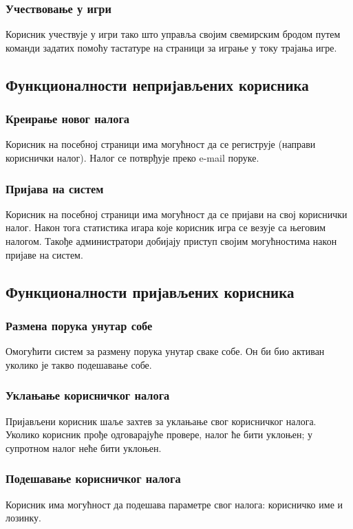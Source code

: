 \subsubsection{Учествовање у игри}
Корисник учествује у игри тако што управља својим свемирским бродом путем команди задатих помоћу тастатуре
на страници за играње у току трајања игре.

\subsection{Функционалности непријављених корисника}

\subsubsection{Креирање новог налога} 
Корисник на посебној страници има могућност да се региструје (направи кориснички налог).
Налог се потврђује преко e-mail поруке.

\subsubsection{Пријава на систем}
Корисник на посебној страници има могућност да се пријави на свој кориснички налог.
Након тога статистика игара које корисник игра се везује са његовим налогом. 
Такође администратори добијају приступ својим могућностима након пријаве на систем.

\subsection{Функционалности пријављених корисника}

\subsubsection{Размена порука унутар собе}
Омогућити систем за размену порука унутар сваке собе. Он би био активан уколико је такво подешавање собе.

\subsubsection{Уклањање корисничког налога}
Пријављени корисник шаље захтев за уклањање свог корисничког налога. Уколико корисник прође одговарајуће провере,
налог ће бити уклоњен; у супротном налог неће бити уклоњен.

\subsubsection{Подешавање корисничког налога}
Корисник има могућност да подешава параметре свог налога: корисничко име и лозинку.

